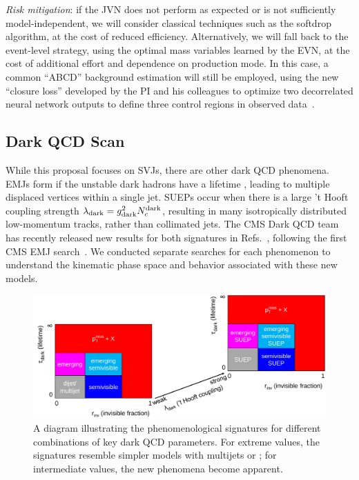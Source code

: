 \textit{Risk mitigation}: if the JVN does not perform as expected or is not sufficiently model-independent, we will consider classical techniques such as the softdrop algorithm, at the cost of reduced efficiency.
Alternatively, we will fall back to the event-level strategy, using the optimal mass variables learned by the EVN, at the cost of additional effort and dependence on production mode.
In this case, a common ``ABCD'' background estimation will still be employed, using the new ``closure loss'' developed by the PI and his colleagues
to optimize two decorrelated neural network outputs to define three control regions in observed data~\cite{Crossman:2023aps}.

\subsection{Dark QCD Scan}\label{subsec:darkscan}

While this proposal focuses on SVJs, there are other dark QCD phenomena.
EMJs form if the unstable dark hadrons have a lifetime \taudark, leading to multiple displaced vertices within a single jet.
SUEPs occur when there is a large 't Hooft coupling strength $\lambda_\text{dark} = g_{\mathrm{dark}}^2 N_{c}^{\text{dark}}$,
resulting in many isotropically distributed low-momentum tracks, rather than collimated jets.
The CMS Dark QCD team has recently released new results for both signatures in Refs.~\cite{CMS:2024nca,CMS:2024gxp},
following the first CMS EMJ search~\cite{Sirunyan:2018njd}.
We conducted separate searches for each phenomenon to understand the kinematic phase space and behavior associated with these new models.

\begin{figure}[bht]
\centering
\includegraphics[width=0.95\myfigurewidth]{figures/svj_acceptance_diagram_v7.pdf}
\caption{A diagram illustrating the phenomenological signatures for different combinations of key dark QCD parameters.
For extreme values, the signatures resemble simpler models with multijets or \ptmiss; for intermediate values, the new phenomena become apparent.
}
\label{fig:svjacc}
\end{figure}

